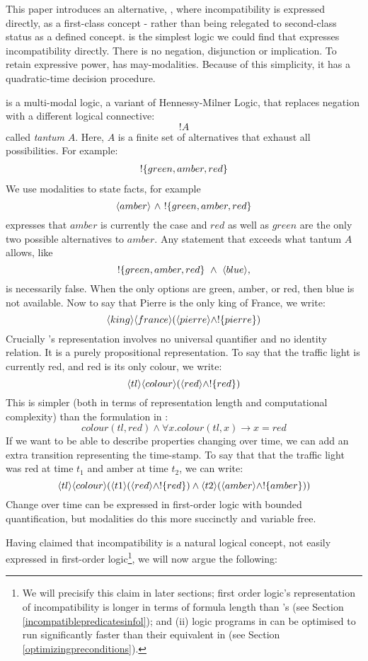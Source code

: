 This paper introduces an alternative, \cathoristic{}, where incompatibility is
expressed directly, as a first-class concept - rather than being relegated
to second-class status as a defined concept. \Cathoristic{} is the simplest
logic we could find that expresses incompatibility directly.  There is no
negation, disjunction or implication. To retain expressive power,
\cathoristic{} has may-modalities.  Because of this simplicity, it has a
quadratic-time decision procedure.

\Cathoristic{} is a multi-modal logic, a variant of Hennessy-Milner Logic,
that replaces negation with a different logical connective:
\[
   !A
\]
called \emph{tantum} $A$. Here, $A$ is a finite set of alternatives
that exhaust all possibilities.  For example:
\begin{eqnarray*}
! \{green, amber, red\}
\end{eqnarray*}
We use modalities to state  facts, for example
\[
   \langle amber \rangle\ \land\ !\{green, amber, red\} 
\]
expresses that $amber$ is currently the case and $red$ as well as
$green$ are the only two possible alternatives to $amber$.  Any
statement that exceeds what tantum $A$ allows, like
\[
   !\{green, amber, red\}\ \AND\ \MAY{blue},
\]
is necessarily false.  When the only options are green, amber, or red,
then blue is not available.  Now to say that Pierre is the only king
of France, we write:
\[
\langle king \rangle \langle france \rangle (\langle pierre \rangle \land ! \{pierre\})
\]
Crucially \cathoristic{}'s representation involves no
universal quantifier and no identity relation.  It is a purely
propositional representation.  To say that the traffic
light is currently red, and red is its only colour, we write:
\[
\langle tl \rangle \langle colour \rangle (\langle red \rangle \land !\{red\})
\]
This is simpler (both in terms of representation length and
computational complexity) than the formulation in \fol{}:
\[
colour(tl, red) \land \forall x . colour(tl, x) \rightarrow x = red
\]
If we want to be able to describe properties changing over time, we
can add an extra transition representing the time-stamp.  To say that
that the traffic light was red at time $t_1$ and amber at time $t_2$,
we can write:
\[
   \langle tl \rangle \langle colour \rangle (\langle t1 \rangle (\langle red \rangle \land !\{red\}) \land \langle t2 \rangle (\langle amber \rangle \land !\{amber\}))
\]
Change over time can be expressed in first-order logic with bounded
quantification, but modalities do this more succinctly and variable
free.

Having claimed that incompatibility is a natural logical concept, not
easily expressed in first-order logic\footnote{We will precisify this
  claim in later sections; first order logic's representation of
  incompatibility is longer in terms of formula length than \cathoristic{}'s (see
  Section \ref{incompatiblepredicatesinfol}); and (ii) logic programs
  in \cathoristic{} can be optimised to run significantly faster than their
  equivalent in \FOL{} (see Section \ref{optimizingpreconditions}).}, we
will now argue the following:


